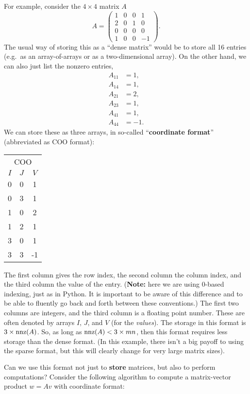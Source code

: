 \documentclass{lecture}
\begin{document}
For example, consider the $4 \times 4$ matrix $A$
\[
   A = \begin{pmatrix}
      1 & 0 & 0 & 1 \\
      2 & 0 & 1 & 0 \\
      0 & 0 & 0 & 0 \\
      1 & 0 & 0 & -1
   \end{pmatrix}.
\]
The usual way of storing this as a ``dense matrix'' would be to store all 16 entries (e.g.\ as an array-of-arrays or as a two-dimensional array).
On the other hand, we can also just list the nonzero entries,
\begin{align*}
   A_{11} &= 1, \\
   A_{14} &= 1, \\
   A_{21} &= 2, \\
   A_{23} &= 1, \\
   A_{41} &= 1, \\
   A_{44} &= -1.
\end{align*}
We can store these as three arrays, in so-called ``\textbf{coordinate format}'' (abbreviated as COO format):
\begin{center}
   \begin{tabular}{ccc}
      \multicolumn{3}{c}{COO}\\
      $I$ & $J$ & $V$\\
      \hline
      0&0&1\\
      0&3&1\\
      1&0&2\\
      1&2&1\\
      3&0&1\\
      3&3&-1
   \end{tabular}
\end{center}
The first column gives the row index, the second column the column index, and the third column the value of the entry.
(\textbf{Note:} here we are using 0-based indexing, just as in Python. It is important to be aware of this difference and to be able to fluently go back and forth between these conventions.)
The first two columns are integers, and the third column is a floating point number.
These are often denoted by arrays $I$, $J$, and $V$ (for the \textit{values}).
The storage in this format is $3 \times \operatorname{nnz}(A)$.
So, as long as $\operatorname{nnz}(A) < 3 \times m n$, then this format requires less storage than the dense format.
(In this example, there isn't a big payoff to using the sparse format, but this will clearly change for very large matrix sizes).

Can we use this format not just to \textbf{store} matrices, but also to perform computations?
Consider the following algorithm to compute a matrix-vector product $w = A v$ with coordinate format:
\end{document}
